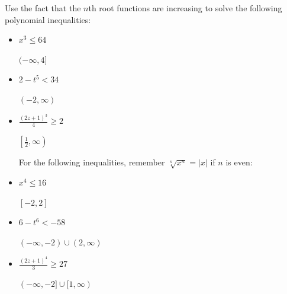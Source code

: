 \documentclass{ximera}
\begin{document}
\begin {problem}
Use the fact that the $n$th root functions are increasing to solve the following polynomial inequalities:

\begin{itemize}
    \item $x^3 \leq 64$ 

    \begin{solution}
        $(-\infty, 4]$ 
    \end{solution}

    \item $2 - t^5 <  34$

    \begin{solution}
    $(-2,  \infty)$   
    \end{solution}

    \item  $\frac{(2z+1)^3}{4} \geq 2$
    
    \begin{solution}
    $\left[ \frac{1}{2}, \infty \right)$
    \end{solution}

For the following inequalities, remember $\sqrt[n]{x^{n}} = |x|$ if $n$ is even:

    \item  $x^4 \leq 16$
    
    \begin{solution}
    $[-2,2]$
    \end{solution}

    \item $6-t^6 < -58$
    
    \begin{solution}
    $(-\infty, -2) \cup (2, \infty)$
    \end{solution}

    \item $\frac{(2z+1)^4}{3} \geq 27$ 
    
    \begin{solution}
    $(-\infty, -2] \cup [1, \infty)$
    \end{solution}
    
\end{itemize}
\end {problem}
\end{document}
